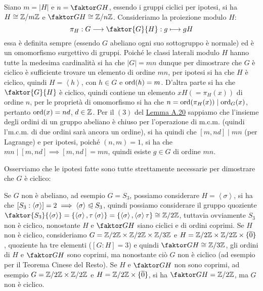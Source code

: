 \documentclass[11pt]{scrartcl}
\begin{document}
\begin{soln}
Siano $m = |H|$ e $n = \faktor GH$, essendo i gruppi ciclici per ipotesi, si ha $H \cong {\mathbb Z}/m{\mathbb Z}$  e 
$\faktor GH \cong \Zn$. Consideriamo la proiezione modulo $H$:
	\[ \pi_H : G \longrightarrow \faktor{G}{H} : g \longmapsto gH
	\]
essa è definita sempre (essendo $G$ abeliano ogni suo sottogruppo è normale) ed è un omomorfismo surgettivo
di gruppi. Poiché le classi laterali modulo $H$ hanno tutte la medesima cardinalità si ha che $|G| = mn$ 
dunque per dimostrare che $G$ è ciclico è sufficiente trovare un elemento di ordine $mn$, per ipotesi si ha che
$H$ è ciclico, quindi $H = \left<h\right>$, con $h \in G$ e $\operatorname{ord}(h) = m$. D'altra parte si ha che $\faktor{G}{H}$ è ciclico,
quindi contiene un elemento $xH (= \pi_H(x))$ di ordine $n$, per le proprietà di omomorfismo si ha che $n = \operatorname{ord}(\pi_H(x)) \mid \operatorname{ord}_G(x)$,
pertanto $\operatorname{ord}(x) = nd$, $d \in \mathbb Z$. Per il $(3)$ del \hyperref[A.20]{Lemma A.20} sappiamo che l'insieme degli ordini di un gruppo abeliano 
è chiuso per l'operazione di m.c.m. (quindi l'm.c.m. di due ordini sarà ancora un ordine), si ha quindi che $[m,nd] \mid mn$ (per Lagrange) e
per ipotesi, poiché $(n,m) = 1$, si ha che $mn \mid [m,nd] \implies [m,nd] = mn$, quindi esiste $g \in G$ di ordine $mn$.
\end{soln}

\begin{remark}
	Osserviamo che le ipotesi fatte sono tutte strettamente necessarie per dimostrare che $G$ è ciclico:
	\begin{itemize}
		\ii Se $G$ non è abeliano, ad esempio $G = S_3$, possiamo considerare $H = \left<\sigma\right>$,
		si ha che $[S_3 : \left<\sigma\right>] = 2 \implies \left<\sigma\right> \trianglelefteqslant S_3$, 
		quindi possiamo considerare il gruppo quoziente $\faktor{S_3}{\left<\sigma\right>} = \{ \left<\sigma\right>, \tau\left<\sigma\right>\} = 
		\{ \left<\sigma\right>, \left<\sigma\right>\tau\} \cong \Z2$, tuttavia ovviamente $S_3$ non è ciclico, nonostante $H$ e $\faktor GH$ siano ciclici e
		di ordini coprimi.
		\ii Se $H$ non è ciclico, consideriamo $G = \mathbb{Z}/{2}\mathbb{Z} \times \mathbb{Z}/{2}\mathbb{Z} \times \mathbb{Z}/{3}\mathbb{Z}$ e $H = \mathbb{Z}/{2}\mathbb{Z} \times \mathbb{Z}/{2}\mathbb{Z} \times \{\overline 0\}$, quoziente ha tre elementi ($[G:H] = 3$) e quindi
		$\faktor GH \cong \Z3$, gli ordini di $H$ e $\faktor GH$ sono coprimi, ma nonostante ciò $G$ non è ciclico (ad esempio per il Teorema Cinese del Resto).
		\ii Se $H$ e $\faktor GH$ non sono coprimi, ad esempio $G = \mathbb{Z}/{2}\mathbb{Z} \times \mathbb{Z}/{2}\mathbb{Z}$ e $H = \mathbb{Z}/{2}\mathbb{Z} \times \{\overline 0\}$, si ha  $\faktor GH = \Z2$, ma $G$ non è ciclico.
	\end{itemize}
\end{remark}
\end{document}
